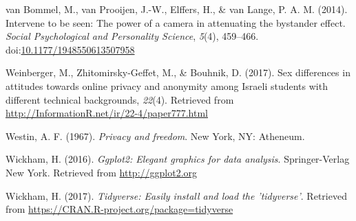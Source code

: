 \documentclass[man,floatsintext]{apa6}
\theoremstyle{definition}
\theoremstyle{definition}
\theoremstyle{definition}
\theoremstyle{remark}
\begin{document}
\leavevmode\hypertarget{ref-vanBommel.2014}{}%
van Bommel, M., van Prooijen, J.-W., Elffers, H., \& van Lange, P. A. M.
(2014). Intervene to be seen: The power of a camera in attenuating the
bystander effect. \emph{Social Psychological and Personality Science},
\emph{5}(4), 459--466.
doi:\href{https://doi.org/10.1177/1948550613507958}{10.1177/1948550613507958}

\leavevmode\hypertarget{ref-Weinberger.2017b}{}%
Weinberger, M., Zhitomirsky-Geffet, M., \& Bouhnik, D. (2017). Sex
differences in attitudes towards online privacy and anonymity among
Israeli students with different technical backgrounds, \emph{22}(4).
Retrieved from \url{http://InformationR.net/ir/22-4/paper777.html}

\leavevmode\hypertarget{ref-Westin.1967}{}%
Westin, A. F. (1967). \emph{Privacy and freedom}. New York, NY:
Atheneum.

\leavevmode\hypertarget{ref-R-ggplot2}{}%
Wickham, H. (2016). \emph{Ggplot2: Elegant graphics for data analysis}.
Springer-Verlag New York. Retrieved from \url{http://ggplot2.org}

\leavevmode\hypertarget{ref-R-tidyverse}{}%
Wickham, H. (2017). \emph{Tidyverse: Easily install and load the
'tidyverse'}. Retrieved from
\url{https://CRAN.R-project.org/package=tidyverse}

\endgroup
\end{document}
